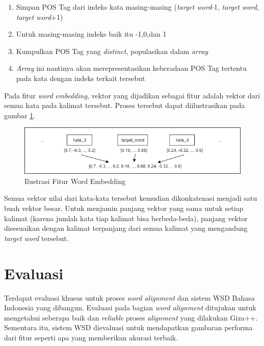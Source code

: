 \begin{enumerate}
	\item Simpan POS Tag dari indeks kata masing-masing (\textit{target word}-1, \textit{target word}, \textit{target word}+1)
	\item Untuk masing-masing indeks baik itu -1,0,dan 1
	\item Kumpulkan POS Tag yang \textit{distinct}, populasikan dalam \textit{array}
	\item \textit{Array} ini nantinya akan merepresentasikan keberadaan POS Tag tertentu pada kata dengan indeks terkait tersebut
\end{enumerate}

Pada fitur \textit{word embedding}, vektor yang dijadikan sebagai fitur adalah vektor dari semua kata pada kalimat tersebut. Proses tersebut dapat diilustrasikan pada gambar \ref{fig:Ilustrasi-Fitur-Word-Embedding}.
\begin{figure}
	\centering
	\includegraphics[width=1\linewidth]{adit_pics/we-vector.png}
	\caption{Ilustrasi Fitur Word Embedding}
	\label{fig:Ilustrasi-Fitur-Word-Embedding}
\end{figure}

Semua vektor nilai dari kata-kata tersebut kemudian dikonkatenasi menjadi satu buah vektor besar. Untuk menjamin panjang vektor yang sama untuk setiap kalimat (karena jumlah kata tiap kalimat bisa berbeda-beda), panjang vektor disesuaikan dengan kalimat terpanjang dari semua kalimat yang mengandung \textit{target word} tersebut.



\section{Evaluasi}

Terdapat evaluasi khusus untuk proses \textit{word alignment} dan sistem WSD Bahasa Indonesia yang dibangun. Evaluasi pada bagian \textit{word alignment} ditujukan untuk mengetahui seberapa baik dan \textit{reliable} proses \textit{alignment} yang dilakukan Giza++. Sementara itu, sistem WSD dievaluasi untuk mendapatkan gambaran performa dari fitur seperti apa yang memberikan akurasi terbaik.

